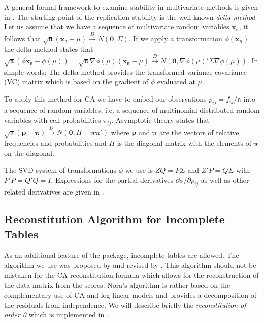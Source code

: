 \documentclass[article]{Z}
\begin{document}
A general formal framework to examine stability in multivariate methods is given in \citet[][Chapter 12]{Gifi:90}. The starting point of the replication stability is the well-known \emph{delta method}. Let us assume that we have a sequence of multivariate random variables $\mathbf{x}_\mathfrak{n}$, it follows that $\sqrt{\mathfrak{n}}(\mathbf{x}_\mathfrak{n}-\mu)\stackrel{D}{\rightarrow}N(\mathbf{0},\Sigma)$. If we apply a transformation $\phi(\mathbf{x}_n)$ the delta method states that $\sqrt{\mathfrak{n}}(\phi{\mathbf{x}}_\mathfrak{n}-\phi(\mu)) = \sqrt{\mathfrak{n}}\nabla \phi(\mu)(\mathbf{x}_\mathfrak{n}-\mu) \stackrel{D}{\rightarrow}N(\mathbf{0},\nabla \phi(\mu)'\Sigma \nabla \phi(\mu))$. In simple words: The delta method provides the transformed variance-covariance (VC) matrix which is based on the gradient of $\phi$ evaluated at $\mu$. 

To apply this method for CA we have to embed our observations $p_{ij} = f_{ij}/\mathfrak{n}$ into a sequence of random variables, i.e. a sequence of multinomial distributed random variables with cell probabilities $\pi_{ij}$. Asymptotic theory states that $\sqrt{\mathfrak{n}}(\mathbf{p}-\boldsymbol{\pi})\stackrel{D}{\rightarrow}N(\mathbf{0},\Pi-\boldsymbol{\pi}\boldsymbol{\pi}')$ where $\mathbf{p}$ and $\boldsymbol{\pi}$ are the vectors of relative frequencies and probabilities and $\Pi$ is the diagonal matrix with the elements of $\boldsymbol{\pi}$ on the diagonal. 

The SVD system of transformations $\phi$ we use is $ZQ = P\Sigma$ and $Z'P = Q \Sigma$ with $P'P=Q'Q=I$. Expressions for the partial derivatives $\partial \phi / \partial p_{ij}$ as well as other related derivatives are given in \citet{deLeeuw:2008}. 

\subsection{Reconstitution Algorithm for Incomplete Tables}
As an additional feature of the  package, incomplete tables are allowed. The algorithm we use was proposed by \citet{Nora:75} and revised by \citet{deLeeuw+vanderHeiden:88}. This algorithm should not be mistaken for the CA reconstitution formula which allows for the reconstruction of the data matrix from the scores. Nora's algorithm is rather based on the complementary use of CA and log-linear models \citep[see][]{vanderHeiden+deLeeuw:85} and provides a decomposition of the residuals from independence. We will describe briefly the \emph{reconstitution of order 0} which is implemented in . 
\end{document}
